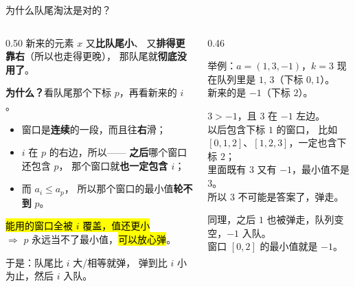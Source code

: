 \documentclass[aspectratio=169]{beamer}
\begin{document}
\begin{frame}{为什么队尾淘汰是对的？}
    \begin{columns}[T]
        \begin{column}{0.50\textwidth}
            \small
            新来的元素 $x$ 又\textbf{比队尾小}、
            又\textbf{排得更靠右}（所以也走得更晚），
            那队尾就\textbf{彻底没用了}。

            \vspace{0.4em}
            \textbf{为什么？}看队尾那个下标 $p$，再看新来的 $i$。
            \begin{itemize}
                \item 窗口是\textbf{连续}的一段，而且往\textbf{右}滑；
                \item $i$ 在 $p$ 的右边，所以——
                      \textbf{之后}哪个窗口还包含 $p$，
                      那个窗口就\textbf{也一定包含 $i$}；
                \item 而 $a_i\le a_p$，
                      所以那个窗口的最小值\textbf{轮不到} $p$。
            \end{itemize}

            \vspace{0.3em}
            \hl{能用的窗口全被 $i$ 覆盖，值还更小}\\
            $\Rightarrow$ $p$ 永远当不了最小值，\hl{可以放心弹}。

            \vspace{0.3em}
            于是：队尾比 $i$ 大/相等就弹，
            弹到比 $i$ 小为止，然后 $i$ 入队。
        \end{column}
        \begin{column}{0.46\textwidth}
            \begin{exampleblock}{举例：$a=(1,3,-1)$，$k=3$}
                \footnotesize
                现在队列里是 $1,\,3$（下标 $0,1$）。\\
                新来的是 $-1$（下标 $2$）。

                \vspace{0.3em}
                $3>-1$，且 $3$ 在 $-1$ 左边。\\
                以后包含下标 $1$ 的窗口，
                比如 $[0,1,2]$、$[1,2,3]$，一定也含下标 $2$；\\
                里面既有 $3$ 又有 $-1$，最小值不是 $3$。\\
                所以 $3$ 不可能是答案了，弹走。

                \vspace{0.3em}
                同理，之后 $1$ 也被弹走，队列变空，$-1$ 入队。\\
                窗口 $[0,2]$ 的最小值就是 $-1$。
            \end{exampleblock}
        \end{column}
    \end{columns}
\end{frame}
\end{document}
